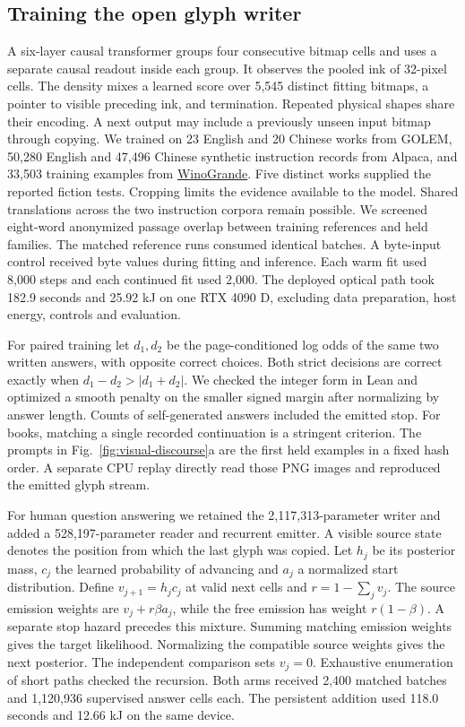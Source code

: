 \subsection*{Training the open glyph writer}
A six-layer causal transformer groups four consecutive bitmap cells and uses a separate causal readout inside each group. It observes the pooled ink of 32-pixel cells. The density mixes a learned score over 5,545 distinct fitting bitmaps, a pointer to visible preceding ink, and termination. Repeated physical shapes share their encoding. A next output may include a previously unseen input bitmap through copying. We trained on 23 English and 20 Chinese works from GOLEM, 50,280 English and 47,496 Chinese synthetic instruction records from Alpaca, and 33,503 training examples from \href{https://winogrande.allenai.org/}{WinoGrande}. Five distinct works supplied the reported fiction tests. Cropping limits the evidence available to the model. Shared translations across the two instruction corpora remain possible. We screened eight-word anonymized passage overlap between training references and held families. The matched reference runs consumed identical batches. A byte-input control received byte values during fitting and inference. Each warm fit used 8,000 steps and each continued fit used 2,000. The deployed optical path took 182.9 seconds and 25.92 kJ on one RTX 4090 D, excluding data preparation, host energy, controls and evaluation.

For paired training let $d_1,d_2$ be the page-conditioned log odds of the same two written answers, with opposite correct choices. Both strict decisions are correct exactly when $d_1-d_2>|d_1+d_2|$. We checked the integer form in Lean and optimized a smooth penalty on the smaller signed margin after normalizing by answer length. Counts of self-generated answers included the emitted stop. For books, matching a single recorded continuation is a stringent criterion. The prompts in Fig.~\ref{fig:visual-discourse}a are the first held examples in a fixed hash order. A separate CPU replay directly read those PNG images and reproduced the emitted glyph stream.

For human question answering we retained the 2,117,313-parameter writer and added a 528,197-parameter reader and recurrent emitter. A visible source state denotes the position from which the last glyph was copied. Let $h_j$ be its posterior mass, $c_j$ the learned probability of advancing and $a_j$ a normalized start distribution. Define $v_{j+1}=h_j c_j$ at valid next cells and $r=1-\sum_j v_j$. The source emission weights are $v_j+r\beta a_j$, while the free emission has weight $r(1-\beta)$. A separate stop hazard precedes this mixture. Summing matching emission weights gives the target likelihood. Normalizing the compatible source weights gives the next posterior. The independent comparison sets $v_j=0$. Exhaustive enumeration of short paths checked the recursion. Both arms received 2,400 matched batches and 1,120,936 supervised answer cells each. The persistent addition used 118.0 seconds and 12.66 kJ on the same device.


